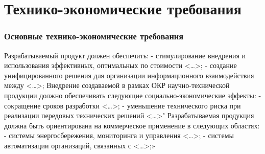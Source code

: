 			\subsubsection{}

	\section{Технико-экономические требования}
		\subsubsection{Основные технико-экономические требования}
			Разрабатываемый продукт должен обеспечить:
			- стимулирование внедрения и использования эффективных, оптимальных по стоимости <…>;
			- создание унифицированного решения для организации информационного взаимодействия между <…>; 
			Внедрение создаваемой в рамках ОКР научно-технической продукции должно обеспечивать следующие социально-экономические эффекты:
			- сокращение сроков разработки <…>;
			- уменьшение технического риска при реализации передовых технических решений <…>"
			Разрабатываемая продукция должна быть ориентирована на коммерческое применение в следующих областях:
			- системы энергосбережения, мониторинга и управления <…>;
			- системы автоматизации организаций, связанных с <…>;»

